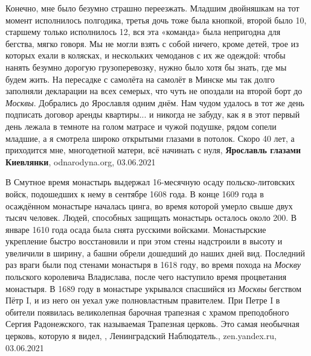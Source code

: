 Конечно, мне было безумно страшно переезжать. Младшим двойняшкам на тот момент
исполнилось полгодика, третья дочь тоже была кнопкой, второй было 10, старшему
только исполнилось 12, вся эта «команда» была непригодна для бегства, мягко
говоря. Мы не могли взять с собой ничего, кроме детей, трое из которых ехали в
колясках,  и нескольких чемоданов с их же одеждой: чтобы нанять безумно дорогую
грузоперевозку, нужно было хотя бы знать, где мы будем жить. На пересадке с
самолёта на самолёт в Минске мы так долго заполняли декларации на всех семерых,
что чуть не опоздали на второй борт до \emph{Москвы}. Добрались до Ярославля
одним днём. Нам чудом удалось в тот же день подписать договор аренды
квартиры... и никогда не забуду, как я в этот первый день лежала в темноте на
голом матрасе и чужой подушке, рядом сопели младшие, а я смотрела широко
открытыми глазами в потолок. Скоро 40 лет, а приходится мне, многодетной
матери, всё начинать с нуля,
\textbf{Ярославль глазами Киевлянки},
odnarodyna.org, 03.06.2021

В Смутное время монастырь выдержал 16-месячную осаду польско-литовских войск,
подошедших к нему в сентябре 1608 года. В конце 1609 года в осаждённом
монастыре началась цинга, во время которой умерло свыше двух тысяч человек.
Людей, способных защищать монастырь осталось около 200. В январе 1610 года
осада была снята русскими войсками. Монастырские укрепление быстро восстановили
и при этом стены надстроили в высоту и увеличили в ширину, а башни обрели
дошедший до наших дней вид. Последний раз враги были под стенами монастыря в
1618 году, во время похода на \emph{Москву} польского королевича Владислава,
после чего наступило время процветания монастыря. В 1689 году в монастыре
укрывался спасшийся из \emph{Москвы} бегством Пётр I, и из него он уехал уже
полновластным правителем. При Петре I в обители появилась великолепная барочная
трапезная с храмом преподобного Сергия Радонежского, так называемая Трапезная
церковь. Это самая необычная церковь, которую я видел,
, Ленинградский Наблюдатель., zen.yandex.ru, 03.06.2021

